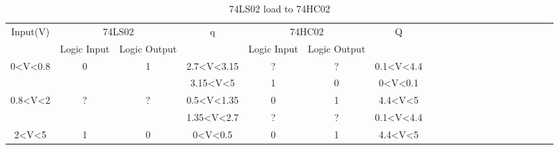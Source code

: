 	\begin{center}
	\hspace{1cm}\begin{table}[h!]
	\begin{tabular}{llllllllllllllllllll}
	\cline{1-7}
	\multicolumn{1}{|c|}{\multirow{2}{*}{Input(V)}} & \multicolumn{2}{c|}{74LS02} & \multicolumn{1}{c|}{\multirow{2}{*}{q}} & \multicolumn{2}{c|}{74HC02} & \multicolumn{1}{c|}{\multirow{2}{*}{Q}}  \\ \cline{2-3} \cline{5-6}
	\multicolumn{1}{|c|}{} & \multicolumn{1}{c|}{Logic Input} & \multicolumn{1}{c|}{Logic Output} & \multicolumn{1}{c|}{} & \multicolumn{1}{c|}{Logic Input} & \multicolumn{1}{c|}{Logic Output} & \multicolumn{1}{c|}{}  \\ \cline{1-7}
	\multicolumn{1}{|c|}{\multirow{2}{*}{0\textless{}V\textless{}0.8}} & \multicolumn{1}{c|}{\multirow{2}{*}{0}} & \multicolumn{1}{c|}{\multirow{2}{*}{1}} & \multicolumn{1}{c|}{2.7\textless{}V\textless{}3.15} & \multicolumn{1}{c|}{?} & \multicolumn{1}{c|}{?} & \multicolumn{1}{c|}{0.1\textless{}V\textless{}4.4}  \\ \cline{4-7}
	\multicolumn{1}{|c|}{} & \multicolumn{1}{c|}{} & \multicolumn{1}{c|}{} & \multicolumn{1}{c|}{3.15\textless{}V\textless{}5} & \multicolumn{1}{c|}{1} & \multicolumn{1}{c|}{0} & \multicolumn{1}{c|}{0\textless{}V\textless{}0.1}  \\ \cline{1-7}
	\multicolumn{1}{|c|}{\multirow{2}{*}{0.8\textless{}V\textless{}2}} & \multicolumn{1}{c|}{\multirow{2}{*}{?}} & \multicolumn{1}{c|}{\multirow{2}{*}{?}} & \multicolumn{1}{c|}{0.5\textless{}V\textless{}1.35} & \multicolumn{1}{c|}{0} & \multicolumn{1}{c|}{1} & \multicolumn{1}{c|}{4.4\textless{}V\textless{}5}  \\ \cline{4-7}
	\multicolumn{1}{|c|}{} & \multicolumn{1}{c|}{} & \multicolumn{1}{c|}{} & \multicolumn{1}{c|}{1.35\textless{}V\textless{}2.7} & \multicolumn{1}{c|}{?} & \multicolumn{1}{c|}{?} & \multicolumn{1}{c|}{0.1\textless{}V\textless{}4.4}  \\ \cline{1-7}
	\multicolumn{1}{|c|}{2\textless{}V\textless{}5} & \multicolumn{1}{c|}{1} & \multicolumn{1}{c|}{0} & \multicolumn{1}{c|}{0\textless{}V\textless{}0.5} & \multicolumn{1}{c|}{0} & \multicolumn{1}{c|}{1} & \multicolumn{1}{c|}{4.4\textless{}V\textless{}5}\\ \cline{1-7}
	\end{tabular}
	\caption{\color{cyan}74LS02 load to 74HC02}
	\label{fig:ej2thlstohc}
	\end{table}
	\end{center}
	
